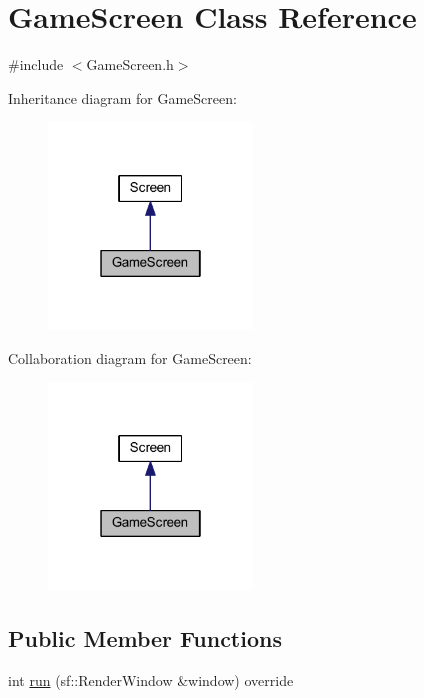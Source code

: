 \hypertarget{class_game_screen}{}\section{Game\+Screen Class Reference}
\label{class_game_screen}


{\ttfamily \#include $<$Game\+Screen.\+h$>$}



Inheritance diagram for Game\+Screen\+:
\nopagebreak
\begin{figure}[H]
\begin{center}
\leavevmode
\includegraphics[width=154pt]{class_game_screen__inherit__graph}
\end{center}
\end{figure}


Collaboration diagram for Game\+Screen\+:
\nopagebreak
\begin{figure}[H]
\begin{center}
\leavevmode
\includegraphics[width=154pt]{class_game_screen__coll__graph}
\end{center}
\end{figure}
\subsection*{Public Member Functions}
\begin{DoxyCompactItemize}
\item 
int \hyperlink{class_game_screen_a0e39ba2968e5fcec952119f7a9d6e437}{run} (sf\+::\+Render\+Window \&window) override
\end{DoxyCompactItemize}


